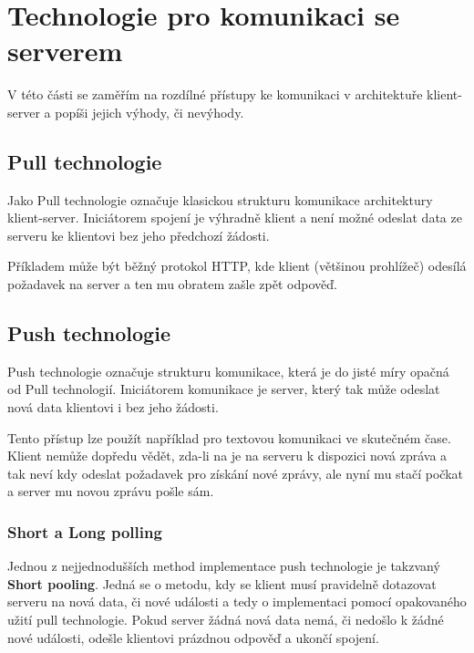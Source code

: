 
\section{Technologie pro komunikaci se serverem}\label{sec:technologieProKomunikaciSeServerem}

V této části se zaměřím na rozdílné přístupy ke komunikaci v architektuře klient-server a popíši jejich výhody, či nevýhody.

\subsection{Pull technologie}\label{subsec:pullTechnologie}

Jako Pull technologie označuje klasickou strukturu komunikace architektury klient-server.
Iniciátorem spojení je výhradně klient a není možné odeslat data ze serveru ke klientovi bez jeho předchozí žádosti.

Příkladem může být běžný protokol \gls{HTTP}, kde klient (většinou prohlížeč) odesílá požadavek na server a ten mu obratem zašle zpět odpověď.~\cite{pushpull:about}

\subsection{Push technologie}\label{subsec:pushTechnologie}

Push technologie označuje strukturu komunikace, která je do jisté míry opačná od Pull technologií.
Iniciátorem komunikace je server, který tak může odeslat nová data klientovi i bez jeho žádosti.

Tento přístup lze použít například pro textovou komunikaci ve skutečném čase.
Klient nemůže dopředu vědět, zda-li na je na serveru k dispozici nová zpráva a tak neví kdy odeslat požadavek pro získání nové zprávy, ale nyní mu stačí počkat a server mu novou zprávu pošle sám.~\cite{pushpull:about}

\subsubsection{Short a Long polling}

Jednou z nejjednodušších method implementace push technologie je takzvaný \textbf{Short pooling}.
Jedná se o metodu, kdy se klient musí pravidelně dotazovat serveru na nová data, či nové události a tedy o implementaci pomocí opakovaného užití pull technologie.
Pokud server žádná nová data nemá, či nedošlo k žádné nové události, odešle klientovi prázdnou odpověď a ukončí spojení.

